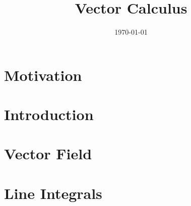 \documentclass{article}
\title{Vector Calculus}
\author{}
\date{\today}
\begin{document}
	\maketitle

	\section{Motivation}
	\label{sec: motivation}
	

	\section{Introduction}
	\label{sec: introduction}
	
	
	\section{Vector Field}
	\label{sec: vector field}
	
		
	\newpage
	\section{Line Integrals}
	\label{sec: line integrals}
	


	
	
\end{document}
